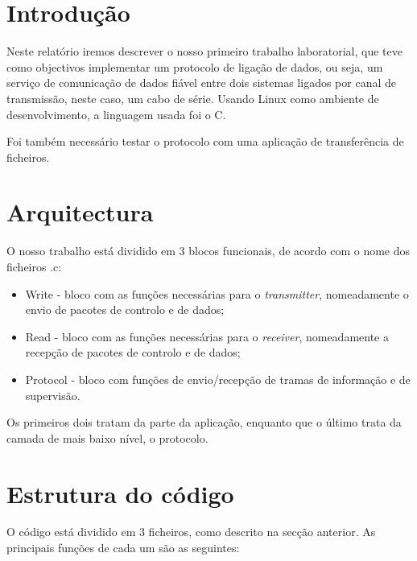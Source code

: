 \documentclass[a4paper,11pt]{article}
\begin{document}

\newpage

\section{Introdução}
Neste relatório iremos descrever o nosso primeiro trabalho laboratorial, que teve como objectivos implementar um protocolo de ligação de dados, ou seja, um serviço de comunicação de dados fiável entre dois sistemas ligados 
por canal de transmissão, neste caso, um cabo de série. Usando Linux como ambiente de desenvolvimento, a linguagem usada foi o C. 

Foi também necessário testar o protocolo com uma aplicação de transferência de ficheiros.

\section{Arquitectura}
O nosso trabalho está dividido em 3 blocos funcionais, de acordo com o nome dos ficheiros .c: 
\begin{itemize}
\item Write - bloco com as funções necessárias para o \textit{transmitter}, nomeadamente o envio de pacotes de controlo e de dados;
\item Read - bloco com as funções necessárias para o \textit{receiver}, nomeadamente a recepção de pacotes de controlo e de dados;
\item Protocol - bloco com funções de envio/recepção de tramas de informação e de supervisão.
\end{itemize}

Os primeiros dois tratam da parte da aplicação, enquanto que o último trata da camada de mais baixo nível, o protocolo.

\section{Estrutura do código}
O código está dividido em 3 ficheiros, como descrito na secção anterior. As principais funções de cada um são as seguintes:
\lstset{language=C,
		showstringspaces=false,
		frame=tb,
		caption=Read.h}
		
\end{document}
